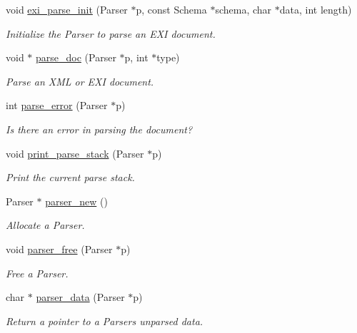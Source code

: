\begin{DoxyCompactItemize}
\item 
void \hyperlink{group__parse_ga69faec40afb94556fb457d8a94db7eed}{exi\+\_\+parse\+\_\+init} (Parser $\ast$p, const Schema $\ast$schema, char $\ast$data, int length)
\begin{DoxyCompactList}\small\item\em Initialize the Parser to parse an E\+XI document. \end{DoxyCompactList}\item 
void $\ast$ \hyperlink{group__parse_gaa8a34fd82dce1d5e2930cb6b9c6213ae}{parse\+\_\+doc} (Parser $\ast$p, int $\ast$type)
\begin{DoxyCompactList}\small\item\em Parse an X\+ML or E\+XI document. \end{DoxyCompactList}\item 
int \hyperlink{group__parse_gafe03ba10b14b1ef18f300a2903fa6fda}{parse\+\_\+error} (Parser $\ast$p)
\begin{DoxyCompactList}\small\item\em Is there an error in parsing the document? \end{DoxyCompactList}\item 
void \hyperlink{group__parse_ga0ba1e788336cceb259406346f55ead8d}{print\+\_\+parse\+\_\+stack} (Parser $\ast$p)
\begin{DoxyCompactList}\small\item\em Print the current parse stack. \end{DoxyCompactList}\item 
\mbox{\label{group__parse_ga934c8c33c8bb24318ba54d2d57647f5d}} 
Parser $\ast$ \hyperlink{group__parse_ga934c8c33c8bb24318ba54d2d57647f5d}{parser\+\_\+new} ()
\begin{DoxyCompactList}\small\item\em Allocate a Parser. \end{DoxyCompactList}\item 
void \hyperlink{group__parse_ga2bd22b6ec87e6096554c665371fa1ba5}{parser\+\_\+free} (Parser $\ast$p)
\begin{DoxyCompactList}\small\item\em Free a Parser. \end{DoxyCompactList}\item 
char $\ast$ \hyperlink{group__parse_gaaafb364e4f9991b31ed7653e936f3806}{parser\+\_\+data} (Parser $\ast$p)
\begin{DoxyCompactList}\small\item\em Return a pointer to a Parser\textquotesingle{}s unparsed data. \end{DoxyCompactList}\item 

\end{DoxyCompactItemize}
